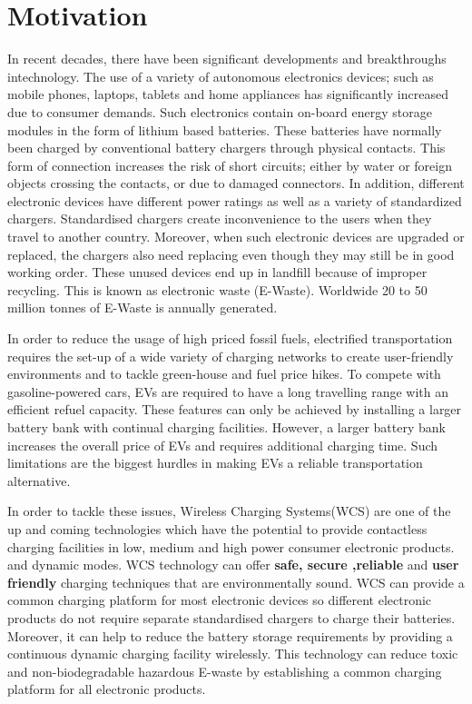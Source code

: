 \documentclass[12pt]{article}
\begin{document}

\tableofcontents
\newpage

\renewcommand{\baselinestretch}{1.5}

\section{Motivation}

In recent decades, there have been significant developments and breakthroughs intechnology. 
The use of a variety of autonomous electronics devices; such as mobile phones, laptops, tablets and home appliances has significantly increased due to consumer
demands. Such electronics contain on-board energy storage modules in the form of
lithium based batteries. These batteries have normally been charged by conventional
battery chargers through physical contacts. This form of connection increases the risk of
short circuits; either by water or foreign objects crossing the contacts, or due to damaged
connectors. In addition, different electronic devices have different power ratings as well
as a variety of standardized chargers. Standardised
chargers create inconvenience to the users when they travel to another country. Moreover, when such electronic devices are upgraded or replaced, the chargers also need replacing
even though they may still be in good working order. These unused devices end up in landfill because of improper recycling. This is known as electronic waste (E-Waste). 
Worldwide 20 to 50 million tonnes of E-Waste is annually generated.

In order to reduce the usage of high priced fossil
fuels, electrified transportation requires the set-up of a wide variety of charging networks to create user-friendly environments and to tackle green-house and fuel price hikes.
To compete with gasoline-powered cars, EVs are required to have a long travelling range with an efficient refuel
capacity. These features can only be achieved by installing a larger battery bank with continual charging facilities. However, a larger battery bank increases the overall price
of EVs and requires additional charging time. Such limitations are the biggest hurdles in making EVs a reliable transportation alternative. 


In order to tackle these issues, Wireless Charging Systems(WCS) are one of the up and coming technologies which have the potential to provide contactless charging facilities in low, medium and high power consumer electronic products. 
and dynamic modes. WCS technology can offer \textbf{safe, secure ,reliable} and \textbf{user friendly} charging techniques that are environmentally sound. WCS can provide a common charging platform for most electronic devices so different electronic products do not require separate standardised chargers to charge their batteries. Moreover, it can help to reduce the battery storage requirements by providing a continuous dynamic charging facility wirelessly. This technology can reduce toxic and non-biodegradable hazardous E-waste by establishing a common charging platform for all electronic products. %
\end{document}
